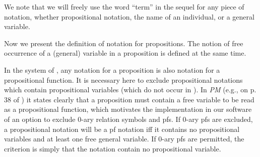 \documentclass{article}
\begin{document}
We note that we will freely use the word ``term'' in the sequel for
any piece of notation, whether propositional notation, the name of an
individual, or a general variable.

Now we present the definition of notation for propositions.  The
notion of free occurrence of a (general) variable in a proposition is
defined at the same time.

In the system of \cite{types40}, any notation for a proposition is
also notation for a propositional function.  It is necessary here to
exclude propositional notations which contain propositional variables
(which do not occur in \cite{types40}).  In {\em PM\/} (e.g., on
p. 38 of \cite{principia}) it states clearly that a proposition must contain a free
variable to be read as a propositional function, which motivates the
implementation in our software of an option to exclude 0-ary relation
symbols and pfs.  If 0-ary pfs are excluded, a propositional notation
will be a pf notation iff it contains no propositional variables and
at least one free general variable.  If 0-ary pfs are permitted, the
criterion is simply that the notation contain no propositional
variable.
\end{document}
